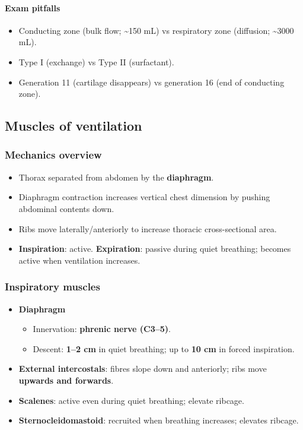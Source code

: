 \documentclass[11pt,a4paper]{article}
\begin{document}
\paragraph{Exam pitfalls}
\begin{itemize}[leftmargin=*,nosep]
  \item Conducting zone (bulk flow; \textasciitilde150 mL) vs respiratory zone (diffusion; \textasciitilde3000 mL).
  \item Type I (exchange) vs Type II (surfactant).
  \item Generation 11 (cartilage disappears) vs generation 16 (end of conducting zone).
\end{itemize}

\subsection{Muscles of ventilation}

\subsubsection{Mechanics overview}
\begin{itemize}[leftmargin=*,nosep]
  \item Thorax separated from abdomen by the \textbf{diaphragm}.
  \item Diaphragm contraction increases vertical chest dimension by pushing abdominal contents down.
  \item Ribs move laterally/anteriorly to increase thoracic cross-sectional area.
  \item \textbf{Inspiration}: active. \quad \textbf{Expiration}: passive during quiet breathing; becomes active when ventilation increases.
\end{itemize}

\subsubsection{Inspiratory muscles}
\begin{itemize}[leftmargin=*,nosep]
  \item \textbf{Diaphragm}
  \begin{itemize}[leftmargin=*,nosep]
    \item Innervation: \textbf{phrenic nerve (C3--5)}.
    \item Descent: \textbf{1--2 cm} in quiet breathing; up to \textbf{10 cm} in forced inspiration.
  \end{itemize}
  \item \textbf{External intercostals}: fibres slope down and anteriorly; ribs move \textbf{upwards and forwards}.
  \item \textbf{Scalenes}: active even during quiet breathing; elevate ribcage.
  \item \textbf{Sternocleidomastoid}: recruited when breathing increases; elevates ribcage.
\end{itemize}
\end{document}
